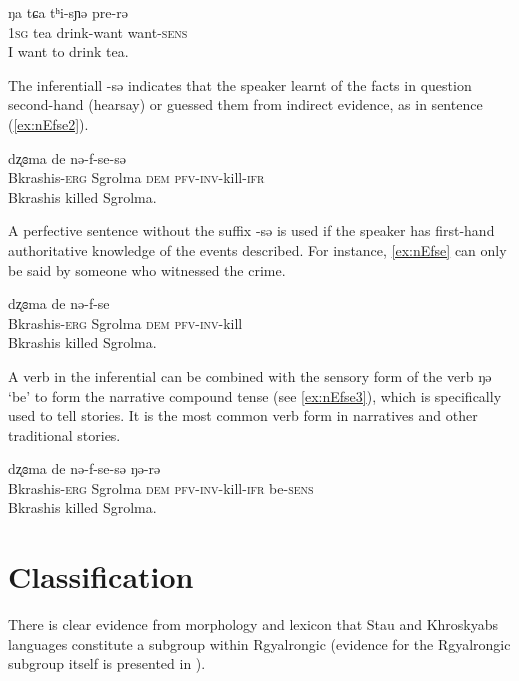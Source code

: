 \documentclass[oneside,a4paper,11pt]{article}
\newcommand{\ipa}[1]{{\phon #1}} %
\begin{document}
\begin{exe}
\ex \label{ex:prerE}
\gll
\ipa{ŋa} 	\ipa{tɕa} 	\ipa{tʰi-sɲə} 	\ipa{pre-rə} \\
\textsc{1sg} tea drink-want want-\textsc{sens} \\
\glt I want to drink tea.
\end{exe}

The inferentiall \ipa{-sə} indicates that the speaker learnt of the facts in question second-hand (hearsay) or guessed them from indirect evidence, as in sentence (\ref{ex:nEfse2}).

\begin{exe}
\ex \label{ex:nEfse2}
\gll \ipa{tʂaɕi-w} 	\ipa{dʐɞma} 	\ipa{de} 	\ipa{nə-f-se-sə}  \\
Bkrashis-\textsc{erg} Sgrolma \textsc{dem} \textsc{pfv-inv}-kill-\textsc{ifr} \\
\glt Bkrashis killed Sgrolma.
\end{exe}

A perfective sentence without the suffix  \ipa{-sə} is used if the speaker has first-hand authoritative knowledge of the events described. For instance, \ref{ex:nEfse} can only be said by someone who witnessed the crime.


\begin{exe}
\ex \label{ex:nEfse}
\gll \ipa{tʂaɕi-w} 	\ipa{dʐɞma} 	\ipa{de} 	\ipa{nə-f-se}  \\
Bkrashis-\textsc{erg} Sgrolma \textsc{dem} \textsc{pfv-inv}-kill \\
\glt Bkrashis killed Sgrolma.
\end{exe}

 

A verb in the inferential can be combined with the sensory form of the verb \ipa{ŋə} `be' to form the narrative compound tense (see \ref{ex:nEfse3}), which is specifically used to tell stories. It is the most common verb form in narratives and other traditional stories.

\begin{exe}
\ex \label{ex:nEfse3}
\gll \ipa{tʂaɕi-w} 	\ipa{dʐɞma} 	\ipa{de} 	\ipa{nə-f-se-sə}  \ipa{ŋə-rə} \\
Bkrashis-\textsc{erg} Sgrolma \textsc{dem} \textsc{pfv-inv}-kill-\textsc{ifr} be-\textsc{sens} \\
\glt Bkrashis killed Sgrolma.
\end{exe}
 

 
 
 
\section{Classification} \label{sec:classification}
 There is clear evidence from morphology and lexicon that Stau and Khroskyabs languages constitute a subgroup within Rgyalrongic (evidence for the Rgyalrongic subgroup itself is presented in \citealt{jackson00puxi}).
 
\end{document}
